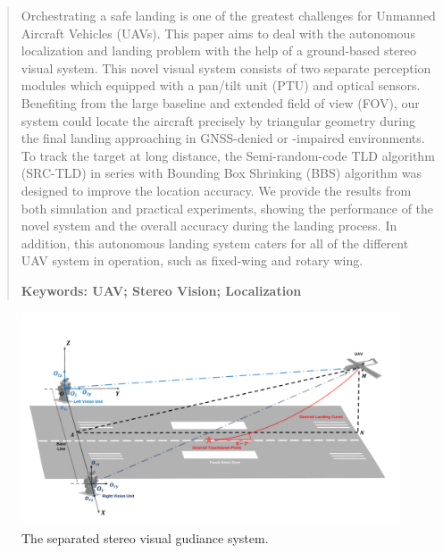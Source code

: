 \begin{abstract}
Orchestrating a safe landing is one of the greatest challenges for Unmanned Aircraft Vehicles (UAVs). This paper aims to deal with the autonomous localization and landing  problem with the help of a ground-based stereo visual system. This novel visual system consists of two separate perception modules which equipped with a pan/tilt unit (PTU) and optical sensors. Benefiting from the large baseline and extended field of view (FOV), our system could locate the aircraft precisely by triangular geometry during the final landing approaching in GNSS-denied or -impaired environments. To track the target at long distance, the Semi-random-code TLD algorithm (SRC-TLD) in series with Bounding Box Shrinking (BBS) algorithm was designed to improve the location accuracy. We provide the results from both simulation and practical experiments, showing the performance of the novel system and the overall accuracy during the landing process. In addition, this autonomous landing system caters for all of the different UAV system in operation, such as fixed-wing and rotary wing. 

 
\textbf{Keywords: UAV; Stereo Vision; Localization}
\end{abstract}

\begin{figure}[!hb]
	\centering
	\includegraphics[width=\textwidth]{Figs/Fig04_GeneralSystem.pdf}
	\caption{The separated stereo visual gudiance system.}
	\label{fig:Fig04_GeneralSystem}
\end{figure}




